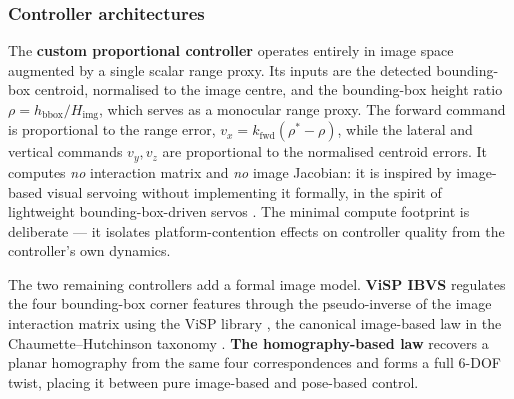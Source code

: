 \subsubsection{Controller architectures}
\label{sec:vs_arch}
The \textbf{custom proportional controller} operates entirely in image space
augmented by a single scalar range proxy. Its inputs are the detected
bounding-box centroid, normalised to the image centre, and the bounding-box
height ratio $\rho=h_{\mathrm{bbox}}/H_{\mathrm{img}}$, which serves as a
monocular range proxy. The forward command is proportional to the range error,
$v_x=k_{\mathrm{fwd}}(\rho^{*}-\rho)$, while the lateral and vertical commands
$v_y,v_z$ are proportional to the normalised centroid errors. It computes
\emph{no} interaction matrix and \emph{no} image Jacobian: it is inspired by
image-based visual servoing \cite{chaumette2006visual} without implementing it
formally, in the spirit of lightweight bounding-box-driven servos
\cite{viki2024hyco,robinson2023visualservowheels}. The minimal compute
footprint is deliberate --- it isolates platform-contention effects on
controller quality from the controller's own dynamics.

The two remaining controllers add a formal image model. \textbf{ViSP IBVS}
regulates the four bounding-box corner features through the pseudo-inverse of
the image interaction matrix using the ViSP library \cite{marchand2005visp},
the canonical image-based law in the Chaumette--Hutchinson taxonomy
\cite{chaumette2006visual}. \textbf{The homography-based law} recovers a planar
homography from the same four correspondences and forms a full $6$-DOF twist,
placing it between pure image-based and pose-based control.

